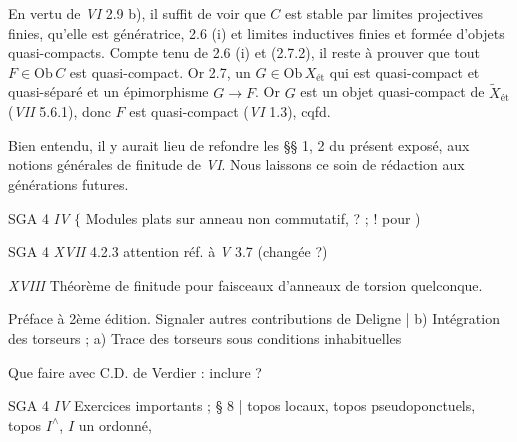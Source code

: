 \documentclass[11pt,a4paper]{article}
\begin{document}
En vertu de \emph{VI} 2.9 b), il suffit de voir que $C$ est stable par limites
projectives finies, qu'elle est génératrice, \ill{} 2.6 (i) et limites
inductives finies et formée d'objets quasi-compacts. \struck{\ill{}} Compte
tenu de 2.6 (i) et (2.7.2), il reste à prouver que tout $F \in \mathrm{Ob}\,C$
est quasi-compact. Or    2.7,   un $G \in
\mathrm{Ob}\,X_{\text{ét}}$ \struck{\ill{}} qui est 
quasi-compact et quasi-séparé \struck{\ill{}} et un épimorphisme $G \to F$. Or
$G$ \struck{\ill{}} est un objet quasi-compact de $\widetilde{X}_{\text{ét}}$
(\emph{VII} 5.6.1), donc $F$ est quasi-compact (\emph{VI} 1.3),
cqfd.

Bien entendu, il y aurait   lieu de refondre
les §§ 1, 2 du présent exposé,  aux notions générales de
 finitude de \emph{VI}. Nous laissons ce soin
\struck{\ill{}} de rédaction aux générations futures.



SGA 4 \emph{IV} $\lbrace$ Modules plats sur anneau non commutatif, \ill{} ? ;
 ! pour  
 \ill{} )

SGA 4 \emph{XVII} 4.2.3 \quad attention réf. à \emph{V} 3.7 (changée ?)

\emph{XVIII} \quad Théorème de finitude pour faisceaux d'anneaux de torsion
quelconque.

Préface à 2ème édition. Signaler autres contributions de
Deligne \quad | b) Intégration des torseurs ; a) Trace des torseurs sous
conditions inhabituelles


Que faire avec C.D. de Verdier : inclure ?


SGA 4 \emph{IV} \quad Exercices importants ; § 8 \quad | topos locaux, topos
pseudoponctuels, topos $I^{\wedge}$, $I$ un ordonné,
\end{document}
